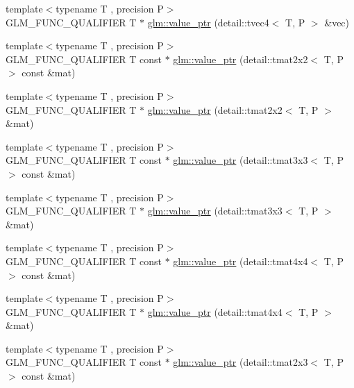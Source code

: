 \begin{DoxyCompactItemize}
\item 
{\footnotesize template$<$typename T , precision P$>$ }\\G\+L\+M\+\_\+\+F\+U\+N\+C\+\_\+\+Q\+U\+A\+L\+I\+F\+I\+ER T $\ast$ \hyperlink{group__gtc__type__ptr_gaa3ed69a05293987972b589311e5feb23}{glm\+::value\+\_\+ptr} (detail\+::tvec4$<$ T, P $>$ \&vec)
\item 
{\footnotesize template$<$typename T , precision P$>$ }\\G\+L\+M\+\_\+\+F\+U\+N\+C\+\_\+\+Q\+U\+A\+L\+I\+F\+I\+ER T const $\ast$ \hyperlink{group__gtc__type__ptr_ga013fcf415d78cc3aa9273c5d4f780325}{glm\+::value\+\_\+ptr} (detail\+::tmat2x2$<$ T, P $>$ const \&mat)
\item 
{\footnotesize template$<$typename T , precision P$>$ }\\G\+L\+M\+\_\+\+F\+U\+N\+C\+\_\+\+Q\+U\+A\+L\+I\+F\+I\+ER T $\ast$ \hyperlink{group__gtc__type__ptr_ga11e5b6c0d7d5d2627df624bb4b219f20}{glm\+::value\+\_\+ptr} (detail\+::tmat2x2$<$ T, P $>$ \&mat)
\item 
{\footnotesize template$<$typename T , precision P$>$ }\\G\+L\+M\+\_\+\+F\+U\+N\+C\+\_\+\+Q\+U\+A\+L\+I\+F\+I\+ER T const $\ast$ \hyperlink{group__gtc__type__ptr_ga78acb1fd15ce7d1d2861493fac9693ec}{glm\+::value\+\_\+ptr} (detail\+::tmat3x3$<$ T, P $>$ const \&mat)
\item 
{\footnotesize template$<$typename T , precision P$>$ }\\G\+L\+M\+\_\+\+F\+U\+N\+C\+\_\+\+Q\+U\+A\+L\+I\+F\+I\+ER T $\ast$ \hyperlink{group__gtc__type__ptr_gaad64150511d5c6a2d2c7afec724e4064}{glm\+::value\+\_\+ptr} (detail\+::tmat3x3$<$ T, P $>$ \&mat)
\item 
{\footnotesize template$<$typename T , precision P$>$ }\\G\+L\+M\+\_\+\+F\+U\+N\+C\+\_\+\+Q\+U\+A\+L\+I\+F\+I\+ER T const $\ast$ \hyperlink{group__gtc__type__ptr_gaa99522f78635f6949ebf82f065bafa94}{glm\+::value\+\_\+ptr} (detail\+::tmat4x4$<$ T, P $>$ const \&mat)
\item 
{\footnotesize template$<$typename T , precision P$>$ }\\G\+L\+M\+\_\+\+F\+U\+N\+C\+\_\+\+Q\+U\+A\+L\+I\+F\+I\+ER T $\ast$ \hyperlink{group__gtc__type__ptr_ga46c85fe444b7260c496be5fe0c146e87}{glm\+::value\+\_\+ptr} (detail\+::tmat4x4$<$ T, P $>$ \&mat)
\item 
{\footnotesize template$<$typename T , precision P$>$ }\\G\+L\+M\+\_\+\+F\+U\+N\+C\+\_\+\+Q\+U\+A\+L\+I\+F\+I\+ER T const $\ast$ \hyperlink{group__gtc__type__ptr_gad5c4faad7a4553c875bc45656fcae73c}{glm\+::value\+\_\+ptr} (detail\+::tmat2x3$<$ T, P $>$ const \&mat)

\end{DoxyCompactItemize}
